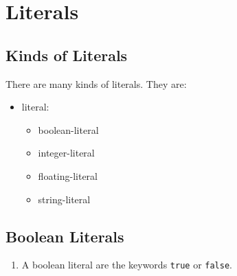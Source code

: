 \section{Literals}

\subsection{Kinds of Literals}\label{ssec:Kinds of Literals}
There are many kinds of literals. They are:

\begin{itemize}[before=\itshape, label={}]
	\item literal:
	\begin{itemize}[before=\itshape, label={}]
		\item boolean-literal
		\item integer-literal 
		\item floating-literal 
		\item string-literal
	\end{itemize}
\end{itemize}

\subsection{Boolean Literals}
\begin{enumerate}
	\item A boolean literal are the keywords \lstinline|true| or \lstinline|false|.
\end{enumerate}

